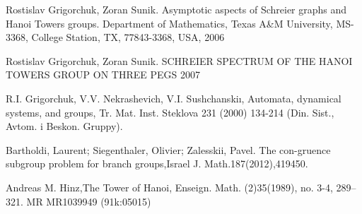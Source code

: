 \documentclass[a4paper,12pt]{amsart}
\begin{document}
\begin{thebibliography}{9}
	Rostislav Grigorchuk, Zoran Sunik. Asymptotic aspects of Schreier graphs and Hanoi Towers groups. Department of Mathematics, Texas A\&M University, MS-3368, College Station, TX, 77843-3368, USA, 2006

	Rostislav Grigorchuk, Zoran Sunik. SCHREIER SPECTRUM OF THE HANOI TOWERS GROUP ON THREE PEGS 2007

	R.I. Grigorchuk, V.V. Nekrashevich, V.I. Sushchanskiı, Automata, dynamical systems, and groups, Tr. Mat. Inst. Steklova 231 (2000) 134-214
	(Din. Sist., Avtom. i Beskon. Gruppy).

	Bartholdi, Laurent; Siegenthaler, Olivier; Zalesskii, Pavel. The con-gruence subgroup problem for branch groups,Israel  J.  Math.187(2012),419450.

	 Andreas M. Hinz,The Tower of Hanoi, Enseign. Math. (2)35(1989),
	no. 3-4, 289–321. MR MR1039949 (91k:05015)

\end{thebibliography}

\newpage
\thispagestyle {empty}
\end{document}
